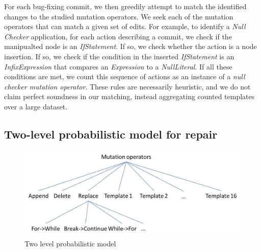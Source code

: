 \documentclass[conference]{IEEEtran}
\begin{document}
For each bug-fixing commit, we then greedily attempt to match the identified changes to the
studied
mutation operators. We seek each of the mutation operators that can match a given set
of edits.  For example, to identify
a \emph{Null Checker} application, for each action describing a commit, we check
if the manipualted node
is an \emph{IfStatement}.  If so, we check whether the action
is a node insertion.  If so, we check if the condition in the inserted
\emph{IfStatement} is an 
\emph{InfixExpression} that compares an 
\emph{Expression} to a
\emph{NullLiteral}. If all these conditions are met, we count this sequence of
actions as an instance of a \emph{null checker mutation operator}.  These rules are
necessarily heuristic, and we do not claim perfect soundness in our matching,
instead aggregating counted templates over a large dataset.  






\subsection{Two-level probabilistic model for repair}

\begin{figure}[!h]
  \centering
    \includegraphics[scale=0.4]{Picture2}
  \caption{Two level probabilistic model}
  \label{fig:probModel}
\end{figure}
\end{document}
